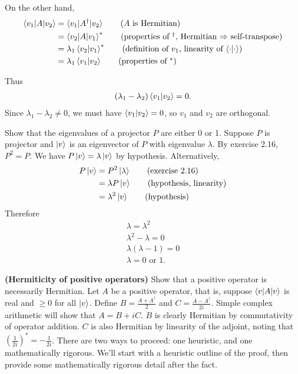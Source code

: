 On the other hand,
\begin{align*}
	\braket{v_1 | A | v_2} &= \braket{v_1 | A^\dagger | v_2} \tag{$A$ is Hermitian}\\ 
	&= \braket{v_2 | A | v_1}^* \tag{properties of $^\dagger$, Hermitian $\Rightarrow$ self-transpose} \\
	&= \lambda_1\braket{v_2 | v_1}^* \tag{definition of $v_1$, linearity of $\braket{\cdot |\cdot}$}\\
	&=  \lambda_1\braket{v_1 | v_2} \tag{properties of $^*$}
\end{align*}

Thus
\begin{align*}
	(\lambda_1 - \lambda_2) \braket{v_1 | v_2}  = 0.
\end{align*}
Since $\lambda_1 - \lambda_2 \neq 0$, we must have $\braket{v_1 | v_2}  = 0$, so $v_1$ and $v_2$ are orthogonal.

 Show that the eigenvalues of a projector $P$  are either 0 or 1.
\Soln Suppose $P$ is projector and $\ket{v}$ is an eigenvector of $P$ with eigenvalue $\lambda$.  By exercise 2.16, $P^2 = P$.  We have $P\ket{v} = \lambda \ket{v}$ by hypothesis.  Alternatively,
\begin{align*}
	P \ket{v} &= P^2 \ket{\lambda} \tag{exercise 2.16} \\
 	&= \lambda  P \ket{v} \tag{hypothesis, linearity} \\
	&= \lambda^2 \ket{v} \tag{hypothesis}
\end{align*}
Therefore
\begin{align*}
	\lambda = \lambda^2\\
	\lambda^2-\lambda = 0 \\
	\lambda (\lambda - 1) = 0\\
	\lambda = 0 \text{ or } 1.
\end{align*}

 \textbf{(Hermiticity of positive operators)} Show that a positive operator is necessarily Hermitian.
\Soln Let $A$ be a positive operator, that is, suppose $\braket{v | A | v}$ is real and $\geq 0$ for all $\ket{v}$.  Define $B =\frac{A + A^\dagger}{2}$ and $ C = \frac{A - A^\dagger}{2i}$.  Simple complex arithmetic will show that $A = B+iC$.  $B$ is clearly Hermitian by commutativity of operator addition. $C$ is also Hermitian by linearity of the adjoint, noting that $\left(\frac{1}{2i}\right)^* = -\frac{1}{2i}$.  There are two ways to proceed: one heuristic, and one mathematically rigorous.  We'll start with a heuristic outline of the proof, then provide some mathematically rigorous detail after the fact. 

